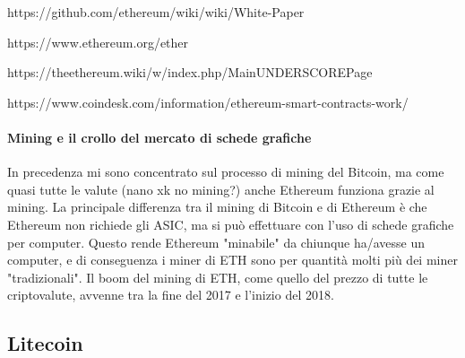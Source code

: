 \documentclass {article}
\begin{document}
https://github.com/ethereum/wiki/wiki/White-Paper

https://www.ethereum.org/ether

https://theethereum.wiki/w/index.php/MainUNDERSCOREPage

https://www.coindesk.com/information/ethereum-smart-contracts-work/


\paragraph {Mining e il crollo del mercato di schede grafiche}


In precedenza mi sono concentrato sul processo di mining del Bitcoin, ma come quasi tutte le valute (nano xk no mining?) anche Ethereum funziona grazie al mining.
La principale differenza tra il mining di Bitcoin e di Ethereum è che Ethereum non richiede gli ASIC, ma si può effettuare con l'uso di schede grafiche per computer.
Questo rende Ethereum "minabile" da chiunque ha/avesse un computer, e di conseguenza i miner di ETH sono per quantità molti più dei miner "tradizionali".
Il boom del mining di ETH, come quello del prezzo di tutte le criptovalute, avvenne tra la fine del 2017 e l'inizio del 2018.


\subsection {Litecoin}
\end{document}
